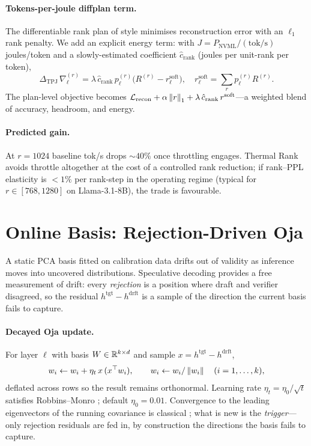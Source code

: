 \documentclass[11pt]{article}
\begin{document}
\paragraph{Tokens-per-joule diffplan term.}  The differentiable rank plan
of \cite{robbins1951sa} style minimises reconstruction error with an
$\ell_1$ rank penalty.  We add an explicit energy term: with
$J=P_\text{NVML}/(\text{tok/s})$ joules/token and a slowly-estimated
coefficient $\hat c_\text{rank}$ (joules per unit-rank per token),
\[
\Delta_\text{TPJ}\,\nabla_\ell^{(r)}=
\lambda\,\hat c_\text{rank}\,p_\ell^{(r)}\bigl(R^{(r)}-r^\text{soft}_\ell\bigr),
\quad r^\text{soft}_\ell=\sum_r p_\ell^{(r)}R^{(r)}.
\]
The plan-level objective becomes $\mathcal L_\text{recon}+\alpha\left\lVert r \right\rVert_1
+\lambda\,\hat c_\text{rank}\,r^\text{soft}$---a weighted blend of accuracy,
headroom, and energy.

\paragraph{Predicted gain.}  At $r{=}1024$ baseline tok/s drops $\sim 40\%$
once throttling engages.  Thermal Rank avoids throttle altogether at the
cost of a controlled rank reduction; if rank--PPL elasticity is $<1\%$ per
rank-step in the operating regime (typical for $r\in[768,1280]$ on
Llama-3.1-8B), the trade is favourable.

\section{Online Basis: Rejection-Driven Oja}
\label{sec:online}
A static PCA basis fitted on calibration data drifts out of validity as
inference moves into uncovered distributions.  Speculative decoding
\cite{leviathan2023speculative,chen2023speculative} provides a free
measurement of drift: every \emph{rejection} is a position where draft and
verifier disagreed, so the residual $h^\text{tgt}-h^\text{drft}$ is a
sample of the direction the current basis fails to capture.

\paragraph{Decayed Oja update.}  For layer $\ell$ with basis
$W\in\mathbb{R}^{k\times d}$ and sample $x=h^\text{tgt}-h^\text{drft}$,
\[
w_i\leftarrow w_i+\eta_t\,x\,(x^\top w_i),\qquad w_i\leftarrow w_i/\left\lVert w_i \right\rVert
\quad(i=1,\dots,k),
\]
deflated across rows so the result remains orthonormal.  Learning rate
$\eta_t=\eta_0/\sqrt t$ satisfies Robbins--Monro \cite{robbins1951sa};
default $\eta_0=0.01$.  Convergence to the leading eigenvectors of the
running covariance is classical \cite{oja1982}; what is new is the
\emph{trigger}---only rejection residuals are fed in, by construction the
directions the basis fails to capture.
\end{document}

